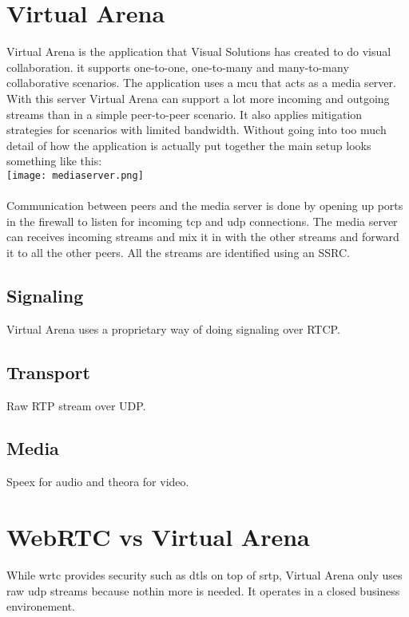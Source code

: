 \section{Virtual Arena}
Virtual Arena is the application that Visual Solutions has created to do visual collaboration. it supports one-to-one, one-to-many and many-to-many collaborative scenarios. The application uses a \gls{mcu} that acts as a media server. With this server Virtual Arena can support a lot more incoming and outgoing streams than in a simple peer-to-peer scenario. It also applies mitigation strategies for scenarios with limited bandwidth. Without going into too much detail of how the application is actually put together the main setup looks something like this: 
\\
\texttt{[image: mediaserver.png]}
\\
\\
Communication between peers and the media server is done by opening up ports in the firewall to listen for incoming tcp and udp connections. The media server can receives incoming streams and mix it in with the other streams and forward it to all the other peers. All the streams are identified using an SSRC.

\subsection{Signaling}
Virtual Arena uses a proprietary way of doing signaling over RTCP.

\subsection{Transport}
Raw RTP stream over UDP.

\subsection{Media}
Speex for audio and theora for video.

\section{WebRTC vs Virtual Arena}
While \gls{wrtc} provides security such as \gls{dtls} on top of \gls{srtp}, Virtual Arena only uses raw \gls{udp} streams because nothin more is needed. It operates in a closed business environement.
